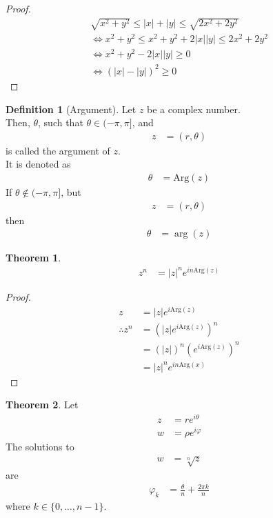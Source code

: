 \documentclass[fleqn, a4paper, 12pt, twoside]{article}
\theoremstyle{definition}
\newtheorem{definition}{Definition}
\theoremstyle{theorem}
\newtheorem{theorem}{Theorem}
\newcommand{\Arg}{\mathrm{Arg}}
\begin{document}
\begin{proof}
	\begin{gather*}
		\sqrt{x^2 + y^2} \le |x| + |y| \le \sqrt{2 x^2 + 2 y^2}\\
		\iff x^2 + y^2 \le x^2 + y^2 + 2 |x| |y| \le 2 x^2 + 2 y^2\\
		\iff x^2 + y^2 - 2 |x| |y| \ge 0\\
		\iff \left( |x| - |y| \right)^2 \ge 0
	\end{gather*}
\end{proof}

\begin{definition}[Argument]
	Let $z$ be a complex number.\\
Then, $\theta$, such that $\theta \in (-\pi,\pi]$, and
	\begin{align*}
		z & = (r,\theta)
	\end{align*}
	is called the argument of $z$.\\
	It is denoted as
	\begin{align*}
		\theta & = \Arg(z)
	\end{align*}
	If $\theta \notin (-\pi,\pi]$, but
	\begin{align*}
		z & = (r,\theta)
	\end{align*}
	then
	\begin{align*}
		\theta & = \arg(z)
	\end{align*}
\end{definition}

\begin{theorem}
	\begin{align*}
		z^n & = |z|^n e^{i n \Arg(z)}
	\end{align*}
\end{theorem}

\begin{proof}
	\begin{align*}
		z              & = |z| e^{i \Arg(z)}                                   \\
		\therefore z^n & = \left( |z| e^{i \Arg(z)} \right)^n                  \\
                               & = \left( |z| \right)^n \left( e^{i \Arg(z)} \right)^n \\
                               & = |z|^n e^{i n \Arg(x)}
	\end{align*}
\end{proof}

\begin{theorem}
	Let
	\begin{align*}
		z & = r e^{i \theta} \\
		w & = \rho e^{i \varphi}
	\end{align*}
	The solutions to
	\begin{align*}
		w & = \sqrt[n]{z}
	\end{align*}
	are
	\begin{align*}
		\varphi_k & = \frac{\theta}{n} + \frac{2 \pi k}{n}
	\end{align*}
	where $k \in \{0,\dots,n - 1\}$.
\end{theorem}
\end{document}
